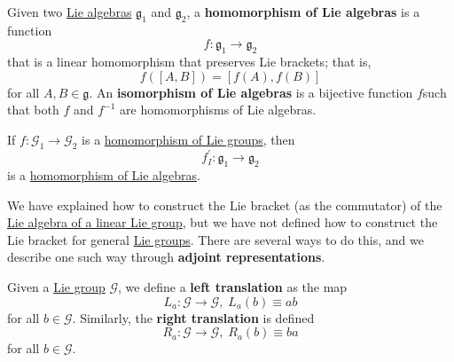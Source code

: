   \begin{definition}
    \label{def:homomorphism-of-lie-algebras}
    Given two \hyperref[def:lie-algebra]{Lie algebras} $\mathfrak{g}_1$ and $\mathfrak{g}_2$, a \textbf{homomorphism of Lie algebras} is a function 
    \begin{equation}
      f: \mathfrak{g}_1 \rightarrow \mathfrak{g}_2
    \end{equation}
    that is a linear homomorphism that preserves Lie brackets; that is, 
    \begin{equation}
      f([A,B]) = [f(A), f(B)]
    \end{equation}
    for all $A, B \in \mathfrak{g}$. An \textbf{isomorphism of Lie algebras} is a bijective function $f$such that both $f$ and $f^{-1}$ are homomorphisms of Lie algebras. 
  \end{definition}

  \begin{theorem}
    \label{thm:induced-homomorphism-of-lie-algebras}
    If $f: \mathcal{G}_1 \rightarrow \mathcal{G}_2$ is a \hyperref[def:homomorphism-of-lie-groups]{homomorphism of Lie groups}, then 
    \begin{equation}
      f_I^\prime: \mathfrak{g}_1 \rightarrow \mathfrak{g}_2
    \end{equation}
    is a \hyperref[def:homomorphism-of-lie-algebras]{homomorphism of Lie algebras}. 
  \end{theorem}

  We have explained how to construct the Lie bracket (as the commutator) of the \hyperref[thm:lie-algebra-of-a-linear-lie-group]{Lie algebra of a linear Lie group}, but we have not defined how to construct the Lie bracket for general \hyperref[def:lie-group]{Lie groups}. There are several ways to do this, and we describe one such way through \textbf{adjoint representations}. 

  \begin{definition}
    \label{def:left-translation}
    Given a \hyperref[def:lie-group]{Lie group} $\mathcal{G}$, we define a \textbf{left translation} as the map
    \begin{equation}
      L_a: \mathcal{G} \rightarrow \mathcal{G}, \; L_a (b) \equiv a b
    \end{equation}
    for all $b \in \mathcal{G}$. Similarly, the \textbf{right translation} is defined
    \begin{equation}
      R_a: \mathcal{G} \rightarrow \mathcal{G}, \; R_a (b) \equiv b a
    \end{equation}
    for all $b \in \mathcal{G}$. 
  \end{definition}

